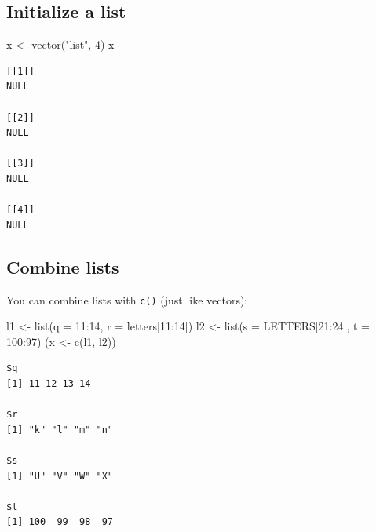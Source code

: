 \documentclass[
]{book}
\newenvironment{Shaded}{\begin{snugshade}}{\end{snugshade}}
\newcommand{\AttributeTok}[1]{\textcolor[rgb]{0.77,0.63,0.00}{#1}}
\newcommand{\DecValTok}[1]{\textcolor[rgb]{0.00,0.00,0.81}{#1}}
\newcommand{\FunctionTok}[1]{\textcolor[rgb]{0.00,0.00,0.00}{#1}}
\newcommand{\NormalTok}[1]{#1}
\newcommand{\OtherTok}[1]{\textcolor[rgb]{0.56,0.35,0.01}{#1}}
\newcommand{\SpecialCharTok}[1]{\textcolor[rgb]{0.00,0.00,0.00}{#1}}
\newcommand{\StringTok}[1]{\textcolor[rgb]{0.31,0.60,0.02}{#1}}
\begin{document}
\hypertarget{initialize-a-list}{%
\subsection{Initialize a list}\label{initialize-a-list}}

\begin{Shaded}
\begin{Highlighting}[]
\NormalTok{x }\OtherTok{\textless{}{-}} \FunctionTok{vector}\NormalTok{(}\StringTok{"list"}\NormalTok{, }\DecValTok{4}\NormalTok{)}
\NormalTok{x}
\end{Highlighting}
\end{Shaded}

\begin{verbatim}
[[1]]
NULL

[[2]]
NULL

[[3]]
NULL

[[4]]
NULL
\end{verbatim}

\hypertarget{combine-lists}{%
\subsection{Combine lists}\label{combine-lists}}

You can combine lists with \texttt{c()} (just like vectors):

\begin{Shaded}
\begin{Highlighting}[]
\NormalTok{l1 }\OtherTok{\textless{}{-}} \FunctionTok{list}\NormalTok{(}\AttributeTok{q =} \DecValTok{11}\SpecialCharTok{:}\DecValTok{14}\NormalTok{, }\AttributeTok{r =}\NormalTok{ letters[}\DecValTok{11}\SpecialCharTok{:}\DecValTok{14}\NormalTok{])}
\NormalTok{l2 }\OtherTok{\textless{}{-}} \FunctionTok{list}\NormalTok{(}\AttributeTok{s =}\NormalTok{ LETTERS[}\DecValTok{21}\SpecialCharTok{:}\DecValTok{24}\NormalTok{], }\AttributeTok{t =} \DecValTok{100}\SpecialCharTok{:}\DecValTok{97}\NormalTok{)}
\NormalTok{(x }\OtherTok{\textless{}{-}} \FunctionTok{c}\NormalTok{(l1, l2))}
\end{Highlighting}
\end{Shaded}

\begin{verbatim}
$q
[1] 11 12 13 14

$r
[1] "k" "l" "m" "n"

$s
[1] "U" "V" "W" "X"

$t
[1] 100  99  98  97
\end{verbatim}
\end{document}
